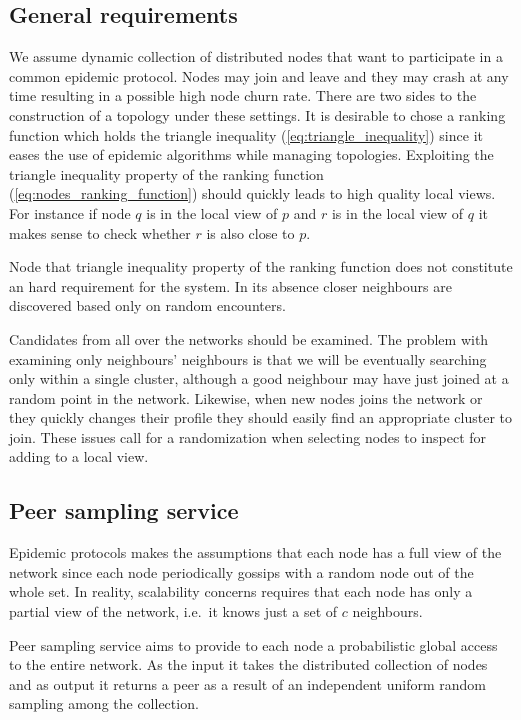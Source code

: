 \subsection{\label{subsec:gen_req}General requirements}
We assume dynamic collection of distributed nodes that want to participate in a common epidemic protocol. Nodes may join and leave and they may crash at any time resulting in a possible high node churn rate. There are two sides to the construction of a topology under these settings. It is desirable to chose a ranking function which holds the triangle inequality (\ref{eq:triangle_inequality}) since it eases the use of epidemic algorithms while managing topologies. Exploiting the triangle inequality property of the ranking function (\ref{eq:nodes_ranking_function}) should quickly leads to high quality local views. For instance if node $q$ is in the local view of $p$ and $r$ is in the local view of $q$ it makes sense to check whether $r$ is also close to $p$.

Node that triangle inequality property of the ranking function does not constitute an hard requirement for the system. In its absence closer neighbours are discovered based only on random encounters.

Candidates from all over the networks should be examined. The problem with examining only neighbours' neighbours is that we will be eventually searching only within a single cluster, although a good neighbour may have just joined at a random point in the network. Likewise, when new nodes joins the network or they quickly changes their profile they should easily find an appropriate cluster to join. These issues call for a randomization when selecting nodes to inspect for adding to a local view.

\subsection{\label{subsec:sampling_service}Peer sampling service}
Epidemic protocols makes the assumptions that each node has a full view of the network since each node periodically gossips with a random node out of the whole set. In reality, scalability concerns requires that each node has only a partial view of the network, i.e.\ it knows just a set of $c$ neighbours.

Peer sampling service aims to provide to each node a probabilistic global access to the entire network. As the input it takes the distributed collection of nodes and as output it returns a peer as a result of an independent uniform random sampling among the collection.

